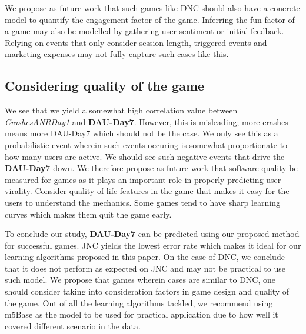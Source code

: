 We propose as future work that such games like DNC should also have a concrete model to quantify the engagement factor of the game. Inferring the fun factor of a game may also be modelled by gathering user sentiment or initial feedback. Relying on events that only consider session length, triggered events and marketing expenses may not fully capture such cases like this.

\subsection{Considering quality of the game}
We see that we yield a somewhat high correlation value between \textit{CrashesANRDay1} and \textbf{DAU-Day7}. However, this is misleading; more crashes means more DAU-Day7 which should not be the case. We only see this as a probabilistic event wherein such events occuring is somewhat proportionate to how many users are active. We should see such negative events that drive the \textbf{DAU-Day7} down. We therefore propose as future work that software quality be measured for games as it plays an important role in properly predicting user virality. Consider quality-of-life features in the game that makes it easy for the users to understand the mechanics. Some games tend to have sharp learning curves which makes them quit the game early.

To conclude our study, \textbf{DAU-Day7} can be predicted using our proposed method for successful games. JNC yields the lowest error rate which makes it ideal for our learning algorithms proposed in this paper. On the case of DNC, we conclude that it does not perform as expected on JNC and may not be practical to use such model. We propose that games wherein cases are similar to DNC, one should consider taking into consideration factors in game design and quality of the game. Out of all the learning algorithms tackled, we recommend using m5Base as the model to be used for practical application due to how well it covered different scenario in the data.